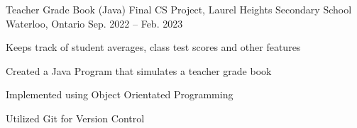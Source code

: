 \begin{cventries}
  \cventry
    {Teacher Grade Book (Java)} %
    {Final CS Project, Laurel Heights Secondary School} %
    {Waterloo, Ontario} %
    {Sep. 2022 -- Feb. 2023} %
    {
      \begin{cvitems} %
        \item {Keeps track of student averages, class test scores and other features}
        \item {Created a Java Program that simulates a teacher grade book}
        \item {Implemented using Object Orientated Programming}
        \item {Utilized Git for Version Control}
      \end{cvitems}
    }
\end{cventries}
